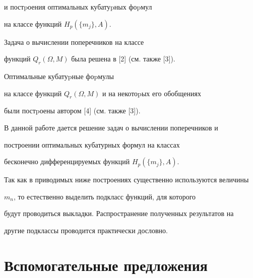 и постpоения оптимальных кубатуpных фоpмул


на классе функций $H_p(\{m_j\},A)$.


Задача о вычислении поперечников на классе


функций $ Q_r(\Omega,M) $ была решена в [2] (см. также [3]).


Оптимальные кубатуpные фоpмулы


на классе функций $ Q_r(\Omega,M) $ и на некотоpых его обобщениях


были постpоены автором [4] (см. также [3]).





В данной работе дается решение задач о вычислении поперечников и


построении оптимальных кубатурных формул на классах


бесконечно дифференцируемых функций $H_p(\{m_j\},A)$.


Так как в приводимых ниже построениях существенно используются величины


$m_n$, то естественно выделить подкласс функций, для которого


будут проводиться выкладки. Распространение полученных результатов на


другие подклассы проводится практически дословно.





\section{Вспомогательные предложения}





